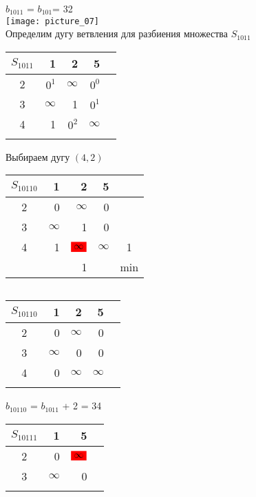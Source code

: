 \documentclass[12pt]{article}
\begin{document}
$b_{1011}$ = $b_{101}$= 32\\

\texttt{[image: picture\_07]}\\ 


Определим дугу ветвления для разбиения множества $S_{1011}$\\

\begin{flushleft}
\begin{tabular}{c||rrr||c}
$S_{1011}$ & 1 & 2  & 5 &  \\
\hline
\hline
2 & $0^1$ & $\infty$   & $0^0$ &  \\
3 & $\infty$ & 1   & $0^1$ &  \\
4 & 1 & $0^2$   & $\infty$ &  \\
\hline
\hline
 &  &  &  &  & \\
\end{tabular}
\end{flushleft}

Выбираем дугу $(4,2)$

\begin{flushleft}
\begin{tabular}{c||rrr||c}
$S_{10110}$ & 1 & 2  & 5 &  \\
\hline
\hline
2 & 0 & $\infty$   & 0 &  \\
3 & $\infty$ & 1   & 0 &  \\
4 & 1 & $\colorbox{red}{$\infty$}$   & $\infty$ &  1\\
\hline
\hline
 &  & 1     && min \\
\end{tabular}
$\qquad $ 
\begin{tabular}{c||rrr||c}
$S_{10110}$ & 1 & 2  & 5 &  \\
\hline
\hline
2 & 0 & $\infty$   & 0 &  \\
3 & $\infty$ & 0   & 0 &  \\
4 & 0 & $\infty$   & $\infty$ & \\
\hline
\hline
 &  &    & \\
\end{tabular}
\end{flushleft}

$b_{10110}$ = $b_{1011}$ + 2 = 34\\

\begin{flushleft}
\begin{tabular}{c||rr||c}
$S_{10111}$ & 1   & 5 &  \\
\hline
\hline
2 & 0 &  $\colorbox{red}{$\infty$}$ &  \\
3 & $\infty$    & 0 &  \\
\hline
\hline
     &  & \\
\end{tabular}
\end{flushleft}
\end{document}
